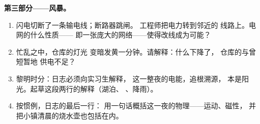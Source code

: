 \begin{problem}
\medskip\noindent\textbf{第三部分——风暴。}
\begin{enumerate}[resume]
  \item 闪电切断了一条输电线；断路器跳闸。
        工程师把电力转到邻近的
        线路上。电网的什么性质——
        即一张庞大的网络——使得改线成为可能？
  \item 忙乱之中，仓库的灯光
        变暗发黄一分钟。请解释：什么下降了，
        仓库的与曾短暂地
        供电不足？
  \item 黎明时分：日志必须向实习生解释，
        这一整夜的电能，追根溯源，
        本是阳光。起草这段两行的解释（湖泊、
        、降雨）。
  \item 按惯例，日志的最后一行：
        用一句话概括这一夜的物理——运动、磁性，
        并把小镇清晨的烧水壶也包括在内。
\end{enumerate}
\end{problem}

